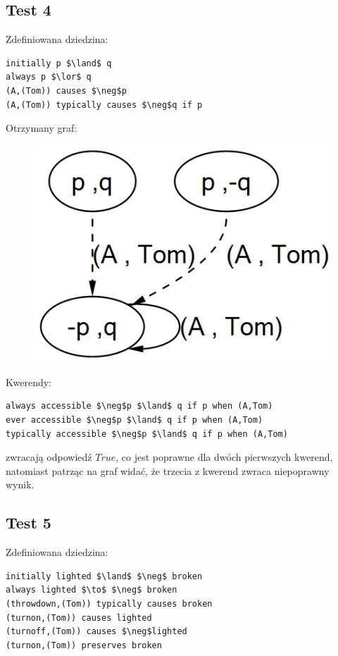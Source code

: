 \documentclass{article}
\begin{document}
\subsection{Test 4}
Zdefiniowana dziedzina:
\bigskip
{}
\begin{lstlisting}[mathescape=true]
initially p $\land$ q
always p $\lor$ q 
(A,(Tom)) causes $\neg$p
(A,(Tom)) typically causes $\neg$q if p
\end{lstlisting}
\vspace{1cm}

Otrzymany graf:
\begin{figure}[H]
	\centering
	\includegraphics[scale=0.6]{test4_graf}
\end{figure}

Kwerendy:
\begin{lstlisting}[mathescape=true]
always accessible $\neg$p $\land$ q if p when (A,Tom)
ever accessible $\neg$p $\land$ q if p when (A,Tom)
typically accessible $\neg$p $\land$ q if p when (A,Tom)
\end{lstlisting}
zwracają odpowiedź $True$, co jest poprawne dla dwóch pierwszych kwerend, natomiast patrząc na graf widać, że trzecia z kwerend zwraca niepoprawny wynik.
\newpage

\subsection{Test 5}
Zdefiniowana dziedzina:
\bigskip
{}
\begin{lstlisting}[mathescape=true]
initially lighted $\land$ $\neg$ broken
always lighted $\to$ $\neg$ broken
(throwdown,(Tom)) typically causes broken
(turnon,(Tom)) causes lighted
(turnoff,(Tom)) causes $\neg$lighted
(turnon,(Tom)) preserves broken
\end{lstlisting}
\vspace{1cm}
\end{document}
